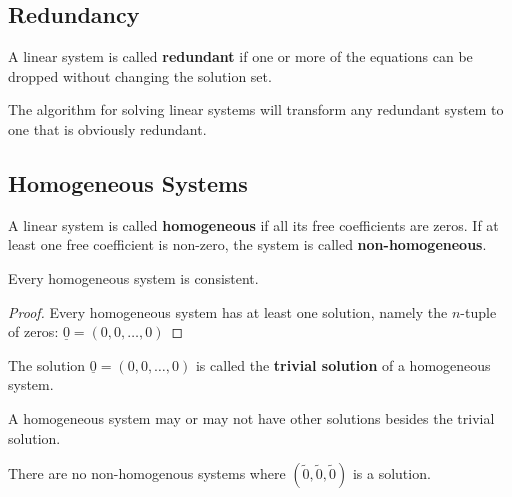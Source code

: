 \subsection{Redundancy}

\begin{definition}[Redundancy]\label{def:redundancy}
    A linear system is called \textbf{redundant} if one or more of the equations can be dropped without changing the solution set.
\end{definition}



\begin{note}
    The algorithm for solving linear systems will transform any redundant system to one that is obviously redundant.
\end{note}

\subsection{Homogeneous Systems}

\begin{definition}\label{def:homogeneous}
    A linear system is called \textbf{homogeneous} if all its free coefficients are zeros. If at least one free coefficient is non-zero, the system is called \textbf{non-homogeneous}.
\end{definition}

\begin{proposition}\label{prop:homogeneous-consistent}
    Every homogeneous system is consistent.
\end{proposition}

\begin{proof}
    Every homogeneous system has at least one solution, namely the $n$-tuple of zeros:
    $\underline{0} = (0, 0, \ldots, 0)$
\end{proof}

\begin{definition}\label{def:trivial-solution}
    The solution $\underline{0} = (0, 0, \ldots, 0)$ is called the \textbf{trivial solution} of a homogeneous system.
\end{definition}

\begin{note}
    A homogeneous system may or may not have other solutions besides the trivial solution.

    There are no non-homogenous systems where $\left(\tilde{0},\tilde{0},\tilde{0}\right)$ is a solution.
\end{note}